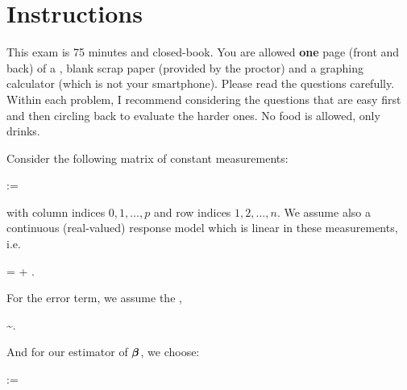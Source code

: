 \documentclass[12pt]{article}
\begin{document}
\section*{Instructions}
This exam is 75 minutes and closed-book. You are allowed \textbf{one} page (front and back) of a , blank scrap paper (provided by the proctor) and a graphing calculator (which is not your smartphone). Please read the questions carefully. Within each problem, I recommend considering the questions that are easy first and then circling back to evaluate the harder ones. No food is allowed, only drinks. %

\pagebreak

\problem Consider the following matrix of constant measurements:

\beqn
\X := 
\eeqn

\noindent with column indices $0, 1, \ldots, p$ and row indices $1, 2, \ldots, n$. We assume also a continuous (real-valued) response model which is linear in these measurements, i.e.

\beqn
\Y = \X\bbeta + \berrorrv.
\eeqn

\noindent For the error term, we assume the ,

\beqn
\berrorrv \sim {}.
\eeqn

\noindent And for our estimator of $\boldsymbol{\beta}$, we choose:

\beqn
\B := \XtXinvXt \Y 
\eeqn
\end{document}
